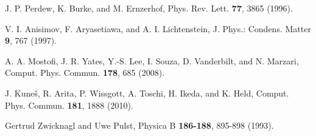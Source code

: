 \documentclass[aps,prl,onecolumn,amsmath,amssymb,superscriptaddress]{revtex4}
\begin{document}
\begin{thebibliography}{}
 J. P. Perdew, K. Burke, and M. Ernzerhof, Phys. Rev. Lett. {\bf 77}, 3865 (1996).

 V. I. Anisimov, F. Aryasetiawa, and A. I. Lichtenstein, J. Phys.: Condens. Matter {\bf 9}, 767 (1997).

 A. A. Mostofi, J. R. Yates, Y.-S. Lee, I. Souza, D. Vanderbilt, and N. Marzari, Comput. Phys. Commun. {\bf 178}, 685 (2008).

 J. Kune\v{s}, R. Arita, P. Wissgott, A. Toschi, H. Ikeda, and K. Held, Comput. Phys. Commun. {\bf 181}, 1888 (2010).

 Gertrud Zwicknagl and Uwe Pulst, Physica B {\bf 186-188}, 895-898 (1993).

\end{thebibliography}
\end{document}
